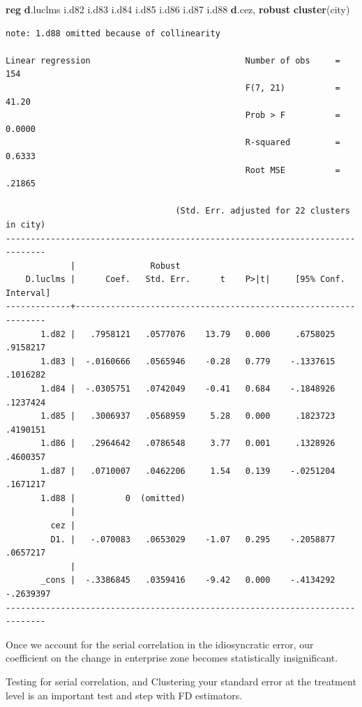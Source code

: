 \documentclass[
]{book}
\newenvironment{Shaded}{\begin{snugshade}}{\end{snugshade}}
\newcommand{\KeywordTok}[1]{\textcolor[rgb]{0.13,0.29,0.53}{\textbf{#1}}}
\newcommand{\NormalTok}[1]{#1}
\begin{document}
\begin{Shaded}
\begin{Highlighting}[]
\KeywordTok{reg} \KeywordTok{d}\NormalTok{.luclms i.d82 i.d83 i.d84 i.d85 i.d86 i.d87 i.d88 }\KeywordTok{d}\NormalTok{.cez, }\KeywordTok{robust} \KeywordTok{cluster}\NormalTok{(city)}
\end{Highlighting}
\end{Shaded}

\begin{verbatim}
note: 1.d88 omitted because of collinearity

Linear regression                               Number of obs     =        154
                                                F(7, 21)          =      41.20
                                                Prob > F          =     0.0000
                                                R-squared         =     0.6333
                                                Root MSE          =     .21865

                                  (Std. Err. adjusted for 22 clusters in city)
------------------------------------------------------------------------------
             |               Robust
    D.luclms |      Coef.   Std. Err.      t    P>|t|     [95% Conf. Interval]
-------------+----------------------------------------------------------------
       1.d82 |   .7958121   .0577076    13.79   0.000     .6758025    .9158217
       1.d83 |  -.0160666   .0565946    -0.28   0.779    -.1337615    .1016282
       1.d84 |  -.0305751   .0742049    -0.41   0.684    -.1848926    .1237424
       1.d85 |   .3006937   .0568959     5.28   0.000     .1823723    .4190151
       1.d86 |   .2964642   .0786548     3.77   0.001     .1328926    .4600357
       1.d87 |   .0710007   .0462206     1.54   0.139    -.0251204    .1671217
       1.d88 |          0  (omitted)
             |
         cez |
         D1. |   -.070083   .0653029    -1.07   0.295    -.2058877    .0657217
             |
       _cons |  -.3386845   .0359416    -9.42   0.000    -.4134292   -.2639397
------------------------------------------------------------------------------
\end{verbatim}

Once we account for the serial correlation in the idiosyncratic error, our coefficient on the change in enterprise zone becomes statistically insignificant.

Testing for serial correlation, and Clustering your standard error at the treatment level is an important test and step with FD estimators.
\end{document}
